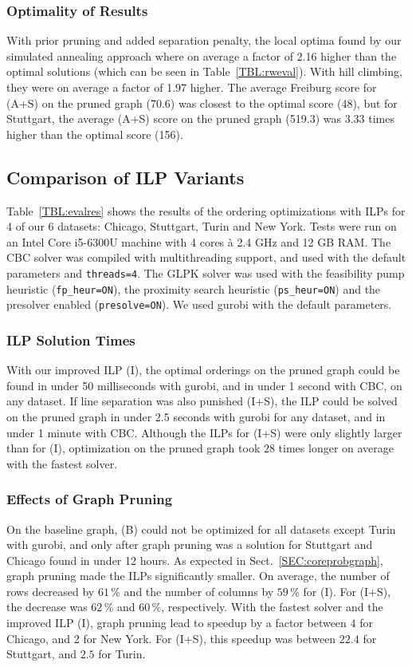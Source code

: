 \documentclass[format=acmsmall, review=false, screen=true]{acmart}
\begin{document}
\subsubsection{Optimality of Results}\label{SEC:baseline_optimality} With prior pruning and added separation penalty, the local optima found by our simulated annealing approach where on average a factor of 2.16 higher than the optimal solutions (which can be seen in Table~\ref{TBL:rweval}). With hill climbing, they were on average a factor of 1.97 higher. The average Freiburg score for (A+S) on the pruned graph (70.6) was closest to the optimal score (48), but for Stuttgart, the average (A+S) score on the pruned graph (519.3) was 3.33 times higher than the optimal score (156).


\subsection{Comparison of ILP Variants}

Table~\ref{TBL:evalres} shows the results of the ordering optimizations with ILPs for 4 of our 6 datasets: Chicago, Stuttgart, Turin and New York.
Tests were run on an Intel Core i5-6300U machine with 4 cores \`{a} 2.4 GHz and 12 GB RAM.
The CBC solver was compiled with multithreading support, and used with the default parameters and \texttt{threads=4}.
The GLPK solver was used with the feasibility pump heuristic (\texttt{fp\_heur=ON}), the proximity search heuristic (\texttt{ps\_heur=ON}) and the presolver enabled (\texttt{presolve=ON}).
We used gurobi with the default parameters.
\subsubsection{ILP Solution Times} With our improved ILP (I), the optimal orderings on the pruned graph could be found in under 50 milliseconds with gurobi, and in under 1 second with CBC, on any dataset.
If line separation was also punished (I+S), the ILP could be solved on the pruned graph in under 2.5 seconds with gurobi for any dataset, and in under 1 minute with CBC.
Although the ILPs for (I+S) were only slightly larger than for (I), optimization on the pruned graph took $28$ times longer on average with the fastest solver.
\subsubsection{Effects of Graph Pruning} On the baseline graph, (B) could not be optimized for all datasets except Turin with gurobi, and only after graph pruning  was a solution for Stuttgart and Chicago found in under 12 hours.
As expected in Sect.~\ref{SEC:coreprobgraph}, graph pruning made the ILPs  significantly smaller.
On average, the number of rows decreased by $61\,\%$ and the number of columns by $59\,\%$ for (I). For (I+S), the decrease was $62\,\%$ and $60\,\%$, respectively. With the fastest solver and the improved ILP (I), graph pruning lead to speedup by a factor between $4$ for Chicago, and 2 for New York. For (I+S), this speedup was between $22.4$ for Stuttgart, and $2.5$ for Turin.
\end{document}
